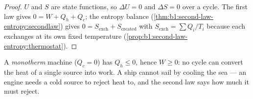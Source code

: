 \begin{proof}
$U$ and $S$ are state functions, so $\Delta U = 0$ and $\Delta S = 0$ over
a cycle. The first law gives $0 = W + Q_h + Q_c$; the entropy balance
(\cref{thm:b1:second-law-entropy:secondlaw}) gives $0 = S_{\mathrm{exch}} +
S_{\mathrm{created}}$ with $S_{\mathrm{exch}} = \sum Q_i/T_i$ because each
 exchanges at its own fixed temperature
(\cref{prop:b1:second-law-entropy:thermostat}).
\end{proof}

\begin{corollary}\label{cor:b1:heat-engines:kelvin}
A \emph{monotherm} machine ($Q_c = 0$) has $Q_h \leq 0$, hence $W \geq 0$:
no cycle can convert the heat of a single source into work. A ship
cannot sail by cooling the sea --- an engine needs a cold source to
reject heat to, and the second law says how much it must reject.
\end{corollary}

